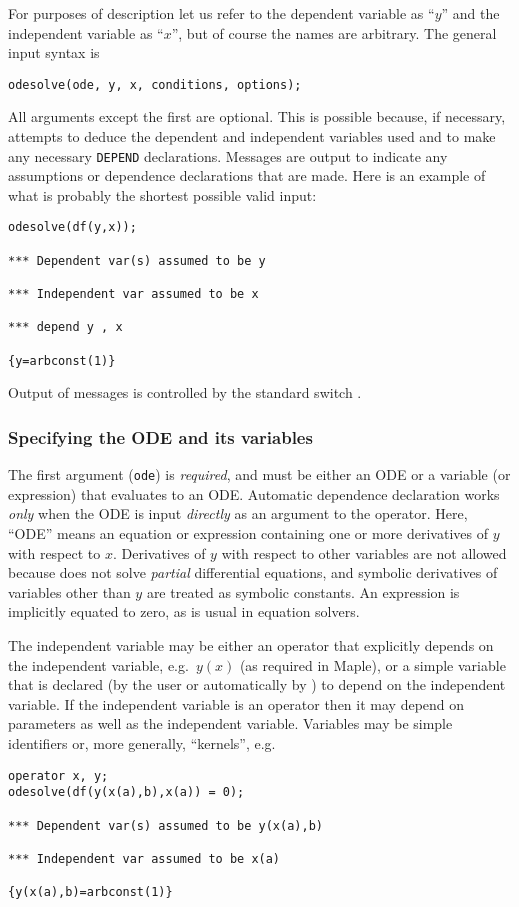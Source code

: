 For purposes of description let us refer to the dependent variable as
``$y$'' and the independent variable as ``$x$'', but of course the
names are arbitrary.  The general input syntax is
\begin{verbatim}
odesolve(ode, y, x, conditions, options);
\end{verbatim}
All arguments except the first are optional.  This is possible
because, if necessary,  attempts to deduce the dependent and
independent variables used and to make any necessary \texttt{DEPEND}
declarations.  Messages are output to indicate any assumptions or
dependence declarations that are made.  Here is an example of what is
probably the shortest possible valid input:
\begin{verbatim}
odesolve(df(y,x));

*** Dependent var(s) assumed to be y

*** Independent var assumed to be x

*** depend y , x

{y=arbconst(1)}
\end{verbatim}
Output of  messages is controlled by the standard \REDUCE{}
switch .


\subsubsection{Specifying the ODE and its variables}

The first argument (\texttt{ode}) is \emph{required}, and must be
either an ODE or a variable (or expression) that evaluates to an
ODE\@.  Automatic dependence declaration works \emph{only} when the
ODE is input \emph{directly} as an argument to the \odesolve{}
operator.  Here, ``ODE'' means an equation or expression containing
one or more derivatives of $y$ with respect to $x$.  Derivatives of
$y$ with respect to other variables are not allowed because 
does not solve \emph{partial} differential equations, and symbolic
derivatives of variables other than $y$ are treated as symbolic
constants.  An expression is implicitly equated to zero, as is usual
in equation solvers.

The independent variable may be either an operator that explicitly
depends on the independent variable, e.g.\ $y(x)$ (as required in
Maple), or a simple variable that is declared (by the user or
automatically by ) to depend on the independent variable.  If
the independent variable is an operator then it may depend on
parameters as well as the independent variable.  Variables may be
simple identifiers or, more generally, \REDUCE{} ``kernels'', e.g.
\begin{verbatim}
operator x, y;
odesolve(df(y(x(a),b),x(a)) = 0);

*** Dependent var(s) assumed to be y(x(a),b)

*** Independent var assumed to be x(a)

{y(x(a),b)=arbconst(1)}
\end{verbatim}

